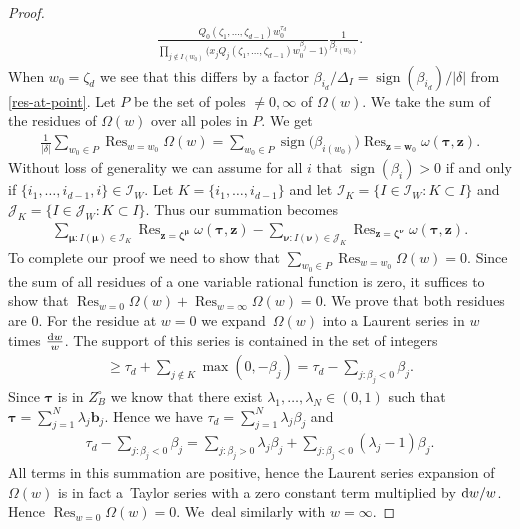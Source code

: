 \documentclass[pdftex]{sigma}
\DeclareMathOperator*{\Res}{Res}
\DeclareMathOperator*{\sign}{sign}
\numberwithin{equation}{section}
\begin{document}
\begin{proof}
\begin{gather*}
\frac{Q_0(\zeta_1,\dots,\zeta_{d-1})w_0^{\tau_d}}{\prod_{j\not\in I(w_0)}
\big(x_jQ_j(\zeta_1,\dots,\zeta_{d-1})w_0^{\beta_j}-1\big)}\frac{1}{\beta_{i(w_0)}}.
\end{gather*}
When $w_0=\zeta_d$ we see that this differs by a factor
$\beta_{i_d}/\Delta_I=\sign(\beta_{i_d})/|\delta|$ from \eqref{res-at-point}.
Let $P$ be the set of poles $\ne0,\infty$ of $\Omega(w)$. We take the sum of the residues
of $\Omega(w)$ over all poles in $P$. We get
\begin{gather*}
\frac{1}{|\delta|}\sum_{w_0\in P}\Res_{w=w_0}\Omega(w)=\sum_{w_0\in P}\sign\big(\beta_{i(w_0)}\big)\Res_{\bm{z}=\bm{w}_0}
\omega(\bm{\tau},\bm{z}).
\end{gather*}
Without loss of generality we can assume for all $i$ that $\sign(\beta_i)>0$ if
and only if $\{i_1,\dots,i_{d-1},i\}\allowbreak\in\mathcal{I}_W$. Let $K=\{i_1,\dots,i_{d-1}\}$ and let $\mathcal{I}_K = \{I \in \mathcal{I}_W\colon K \subset I\}$ and $\mathcal{J}_K = \{I \in \mathcal{J}_W\colon K \subset I\}$.
Thus our summation becomes
\begin{gather*}
\sum_{\bm\mu\colon I(\bm\mu)\in\mathcal{I}_K}\Res_{\bm{z}=\bm{\zeta}^{\bm\mu}}\omega(\bm{\tau},\bm{z})
-\sum_{\bm{\nu}\colon I(\bm\nu)\in\mathcal{J}_K}\Res_{\bm{z}=\bm{\zeta}^{\bm\nu}}\omega(\bm{\tau},\bm{z}).
\end{gather*}
To complete our proof we need to show that $\sum_{w_0\in P}\Res_{w=w_0}\Omega(w)=0$.
Since the sum of all residues of a one variable rational function is zero, it suffices
to show that $\Res_{w=0}\Omega(w)+\Res_{w=\infty}\Omega(w)=0$. We prove that both
residues are $0$. For the residue at $w=0$ we expand~$\Omega(w)$ into a Laurent series in
$w$ times $\frac{{\rm d}w}{w}$. The support of this series is contained in the set of integers
\begin{gather*}
\ge \tau_d+\sum_{j\not\in K}\max(0,-\beta_j)=\tau_d-\sum_{j\colon \beta_j<0}\beta_j.
\end{gather*}
Since $\bm\tau$ is in $Z_B^{\circ}$ we know that there exist $\lambda_1,
\dots,\lambda_N\in(0,1)$ such that $\bm\tau=\sum_{j=1}^N\lambda_j\bm{b}_j$.
Hence we have $\tau_d=\sum_{j=1}^N\lambda_j\beta_j$ and
\begin{gather*}
\tau_d-\sum_{j\colon \beta_j<0}\beta_j =\sum_{j\colon \beta_j>0}\lambda_j\beta_j+
\sum_{j\colon \beta_j<0}(\lambda_j-1)\beta_j.
\end{gather*}
All terms in this summation are positive, hence the Laurent series expansion
of $\Omega(w)$ is in fact a~Taylor series with a zero constant term multiplied by ${\rm d}w/w$.
Hence $\Res_{w=0}\Omega(w)=0$. We~deal similarly with $w=\infty$.
\end{proof}
\end{document}
